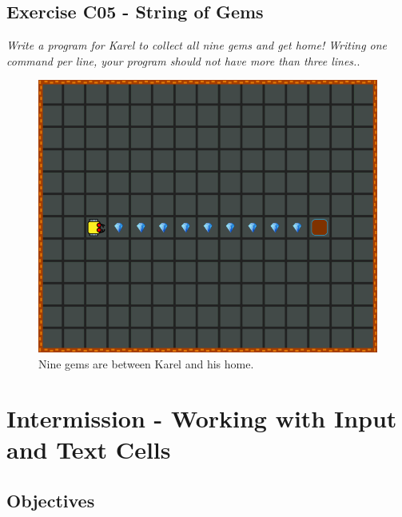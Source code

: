 \documentclass[article,A4,12pt]{llncs}
\begin{document}
{{{{\newpage

\subsection{Exercise C05 - String of Gems}

{\em Write a program for Karel to collect all nine gems and get home! 
Writing one command per line, your program should not have more 
than three lines.}.

\begin{figure}[!ht]
\begin{center}
\includegraphics[height=0.4\textwidth]{img/c05.png}
\end{center}
\vspace{-4mm}
\caption{Nine gems are between Karel and his home.}
\label{fig:c05}
\end{figure}
\noindent

\section{Intermission - Working with Input and Text Cells} \label{sec:editmenu}

\subsection{Objectives} 
 
}}}}
\end{document}
